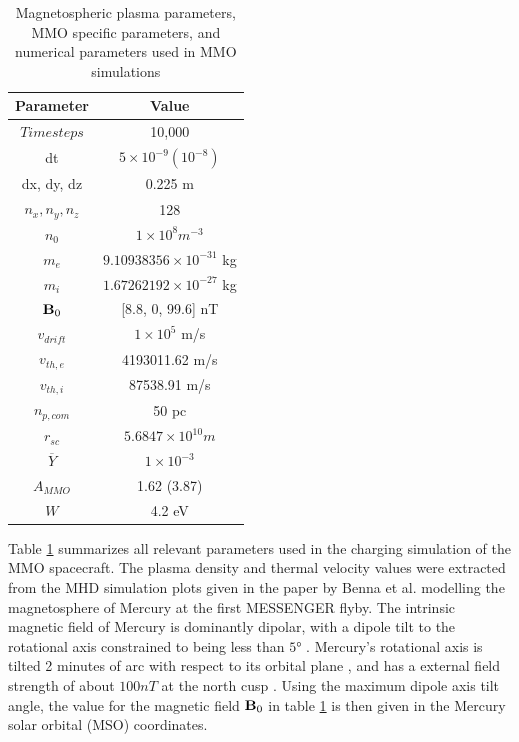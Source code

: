 \begin{table}[H]
    \centering
    \begin{tabular}{c|c}
        \toprule
        \toprule
        Parameter & Value \\
        \midrule
        $Timesteps$ & 10,000 \\
        dt & $5 \times 10^{-9} (10^{-8})$ \\
        dx, dy, dz & 0.225 m \\
        $n_x, n_y, n_z$ & 128 \\
        $n_0$ & $1 \times 10^8 m^{-3}$ \\
        $m_e$ & $9.10938356 \times 10^{-31}$ kg\\
        $m_i$ & $1.67262192 \times 10^{-27}$ kg\\
        $\vb{B}_0$ & [8.8, 0, 99.6] nT\\
        $v_{drift}$ & $1 \times 10^5$ m/s\\
        $v_{th,e}$ & 4193011.62 m/s\\
        $v_{th,i}$ & 87538.91 m/s\\
        $n_{p,com}$ & 50 pc\\
        $r_{sc}$ & $5.6847 \times 10^{10} m$\\
        $\overline{Y}$ & $ 1 \times 10^{-3}$ \\
        $A_{MMO}$ & 1.62 (3.87) \\
        $W$ & 4.2 eV \\
        \bottomrule
        \bottomrule
    \end{tabular}
    \caption{Magnetospheric plasma parameters, MMO specific parameters, and numerical parameters used in MMO simulations}
    \label{tab:PlasmaParamMMO}
\end{table}

Table \ref{tab:PlasmaParamMMO} summarizes all relevant parameters used in the charging simulation of the MMO spacecraft. The plasma density and thermal velocity values were extracted from the MHD simulation plots given in the paper by Benna et al. modelling the magnetosphere of Mercury at the first MESSENGER flyby. The intrinsic magnetic field of Mercury is dominantly dipolar, with a dipole tilt to the rotational axis constrained to being less than $\ang{5}$ \parencite{Anderson2010}. Mercury's rotational axis is tilted 2 minutes of arc with respect to its orbital plane \parencite{Rothery2015}, and has a external field strength of about $100 nT$ at the north cusp \parencite{Anderson2010}. Using the maximum dipole axis tilt angle, the value for the magnetic field $\vb{B}_0$ in table \ref{tab:PlasmaParamMMO} is then given in the Mercury solar orbital (MSO) coordinates. 

